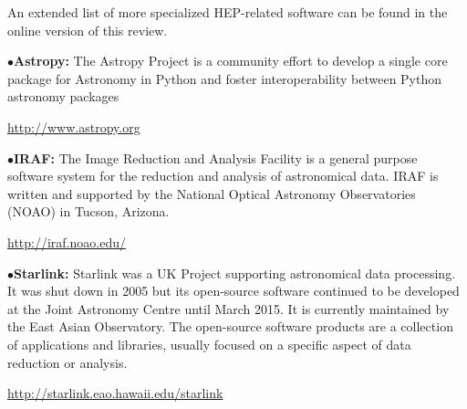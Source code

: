 



An extended list of more specialized HEP-related software can be found in the online version of this review.

\medskip

%

\medskip

\item{$\bullet$}{\bf Astropy:} 
The Astropy Project is a community effort to develop a single core package for Astronomy in Python and foster interoperability between Python astronomy packages
	\item{}\qquad\url{http://www.astropy.org}

\medskip

\item{$\bullet$}{\bf IRAF:} 
The Image Reduction and Analysis Facility is a general purpose software system for the reduction and analysis of astronomical data. IRAF is written and supported by the National Optical Astronomy Observatories (NOAO) in Tucson, Arizona.
	\item{}\qquad\url{http://iraf.noao.edu/}

\medskip

\item{$\bullet$}{\bf Starlink:}
Starlink was a UK Project supporting astronomical data processing. It was shut down in 2005 but its open-source software continued to be developed at the Joint Astronomy Centre until March 2015. It is currently maintained by the East Asian Observatory. The open-source software products are a collection of applications and libraries, usually focused on a specific aspect of data reduction or analysis.
	\item{}\qquad\url{http://starlink.eao.hawaii.edu/starlink}

